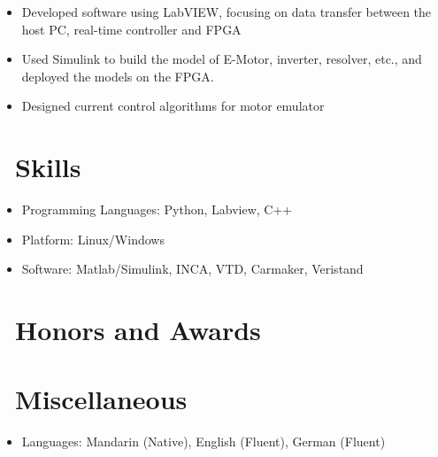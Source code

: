 \documentclass{resume}
\begin{document}

\begin{itemize}
  \item Developed software using LabVIEW, focusing on data transfer between the host PC, real-time controller and FPGA
  \item Used Simulink to build the model of E-Motor, inverter, resolver, etc., and deployed the models on the FPGA.
  \item Designed current control algorithms for motor emulator
\end{itemize}

\section{\faCogs\ Skills}
\begin{itemize}[parsep=0.5ex]
  \item Programming Languages: Python, Labview, C++
  \item Platform: Linux/Windows
  \item Software: Matlab/Simulink, INCA, VTD, Carmaker, Veristand 
\end{itemize}

\section{\faHeartO\ Honors and Awards}

\section{\faInfo\ Miscellaneous}
\begin{itemize}[parsep=0.5ex]
  \item Languages: Mandarin (Native), English (Fluent), German (Fluent)
\end{itemize}

%
%
\end{document}
